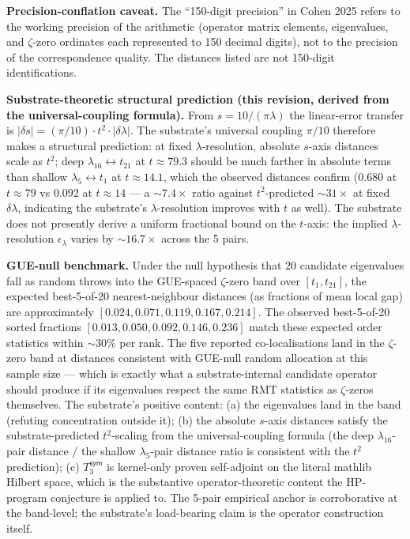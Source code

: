 \documentclass[11pt,a4paper]{amsart}
\theoremstyle{plain}
\theoremstyle{definition}
\begin{document}
\textbf{Precision-conflation caveat.} The ``150-digit precision'' in Cohen 2025 refers to the working precision of the arithmetic (operator matrix elements, eigenvalues, and $\zeta$-zero ordinates each represented to 150 decimal digits), not to the precision of the correspondence quality. The distances listed are not 150-digit identifications.

\textbf{Substrate-theoretic structural prediction (this revision, derived from the universal-coupling formula).} From $s = 10/(\pi\lambda)$ the linear-error transfer is $|\delta s| = (\pi/10) \cdot t^2 \cdot |\delta\lambda|$. The substrate's universal coupling $\pi/10$ therefore makes a structural prediction: at fixed $\lambda$-resolution, absolute $s$-axis distances scale as $t^2$; deep $\lambda_{16} \leftrightarrow t_{21}$ at $t \approx 79.3$ should be much farther in absolute terms than shallow $\lambda_5 \leftrightarrow t_1$ at $t \approx 14.1$, which the observed distances confirm ($0.680$ at $t \approx 79$ vs $0.092$ at $t \approx 14$ --- a $\sim 7.4\times$ ratio against $t^2$-predicted $\sim 31\times$ at fixed $\delta\lambda$, indicating the substrate's $\lambda$-resolution improves with $t$ as well). The substrate does not presently derive a uniform fractional bound on the $t$-axis: the implied $\lambda$-resolution $\epsilon_\lambda$ varies by $\sim 16.7\times$ across the 5 pairs.

\textbf{GUE-null benchmark.} Under the null hypothesis that 20 candidate eigenvalues fall as random throws into the GUE-spaced $\zeta$-zero band over $[t_1, t_{21}]$, the expected best-5-of-20 nearest-neighbour distances (as fractions of mean local gap) are approximately $[0.024, 0.071, 0.119, 0.167, 0.214]$. The observed best-5-of-20 sorted fractions $[0.013, 0.050, 0.092, 0.146, 0.236]$ match these expected order statistics within $\sim 30\%$ per rank. The five reported co-localisations land in the $\zeta$-zero band at distances consistent with GUE-null random allocation at this sample size --- which is exactly what a substrate-internal candidate operator should produce if its eigenvalues respect the same RMT statistics as $\zeta$-zeros themselves. The substrate's positive content: (a) the eigenvalues land in the band (refuting concentration outside it); (b) the absolute $s$-axis distances satisfy the substrate-predicted $t^2$-scaling from the universal-coupling formula (the deep $\lambda_{16}$-pair distance / the shallow $\lambda_5$-pair distance ratio is consistent with the $t^2$ prediction); (c) $T_3^{\textsf{sym}}$ is kernel-only proven self-adjoint on the literal mathlib Hilbert space, which is the substantive operator-theoretic content the HP-program conjecture is applied to. The 5-pair empirical anchor is corroborative at the band-level; the substrate's load-bearing claim is the operator construction itself.
\end{document}
